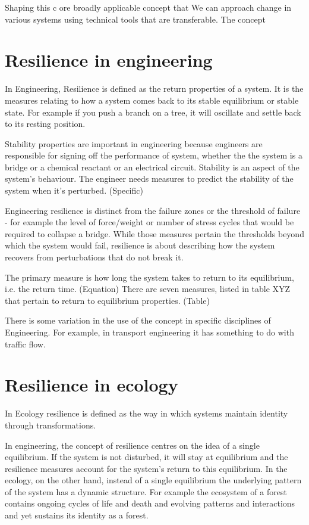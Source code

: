 Shaping this c
ore broadly applicable concept that 
We can approach change in various systems using technical tools that are transferable. 
The concept 

\section{Resilience in engineering}

In Engineering, Resilience is defined as the return properties of a system. 
It is the measures relating to how a system comes back to its stable equilibrium or stable state. For example if you push a branch on a tree, it will oscillate and settle back to its resting position. 

Stability properties are important in engineering because engineers are responsible for signing off the performance of system, whether the the system is a bridge or a chemical reactant or an electrical circuit. Stability is an aspect of the system’s behaviour. The engineer needs measures to predict the stability of the system when it's perturbed. (Specific) 

Engineering resilience is distinct from the failure zones or the threshold of failure - for example the level of force/weight or number of stress cycles that would be required to collapse a bridge. While those measures pertain the thresholds beyond which the system would fail, resilience is about describing how the system recovers from perturbations that do not break it. 

The primary measure is how long the system takes to return to its equilibrium, i.e. the return time. (Equation) There are seven measures, listed in table XYZ that pertain to return to equilibrium properties.  (Table)

There is some variation in the use of the concept in specific disciplines of Engineering. For example, in transport engineering it has something to do with traffic flow.

\section{Resilience in ecology}

In Ecology resilience is defined as the way in which systems maintain identity through transformations. 

In engineering, the concept of resilience centres on the idea of a single equilibrium. If the system is not disturbed, it will stay at equilibrium and the resilience measures account for the system’s return to this equilibrium. In the ecology, on the other hand, instead of a single equilibrium the underlying pattern of the system has a dynamic structure. For example the ecosystem of a forest contains ongoing cycles of life and death and evolving patterns and interactions and yet sustains its identity as a forest. 

